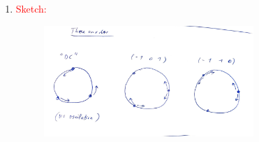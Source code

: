 \documentclass{article}
\theoremstyle{definition}
\begin{document}
\begin{enumerate}[label=(\alph*)]
	
	\item \textcolor{red}{Sketch:}
	\begin{figure}[!htb]
		\centering
		\includegraphics[width=0.75\textwidth]{modees1.jpg}
	\end{figure}
	
	
	

\end{enumerate}
\end{document}
